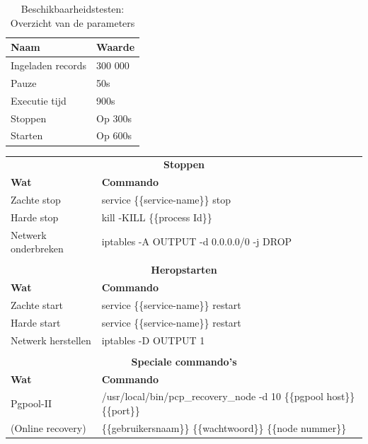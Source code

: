 \begin{table}[h!]
	\centering
	\begin{tabular}{l| l }
		\textbf{Naam} & \textbf{Waarde}  \\
		\hline
		Ingeladen records  & 300 000 \\
		Pauze & 50s \\
		Executie tijd & 900s \\
		Stoppen & Op 300s \\
		Starten & Op 600s \\
	\end{tabular}
	\caption{Beschikbaarheidstesten: Overzicht van de parameters}
	\label{table:beschikbaarheidstesten-parameters}
\end{table}
\begin{table}[t]
	\centering
		\begin{tabular}{l|l}
			\multicolumn{2}{c}{\textbf{Stoppen}} \\
			\textbf{Wat} & \textbf{Commando} \\ 
			\hline
			Zachte stop & service \{\{service-name\}\} stop \\ 
			Harde stop & kill -KILL \{\{process Id\}\} \\ 
			Netwerk onderbreken & iptables -A OUTPUT -d 0.0.0.0/0 -j DROP  \\ 
			\multicolumn{2}{c}{} \\
			\multicolumn{2}{c}{\textbf{Heropstarten}} \\
			\textbf{Wat} & \textbf{Commando} \\ 
			\hline
			Zachte start & service \{\{service-name\}\} restart \\ 
			Harde start & service \{\{service-name\}\} restart \\ 
			Netwerk herstellen & iptables -D OUTPUT 1  \\ 
			\multicolumn{2}{c}{} \\
			\multicolumn{2}{c}{\textbf{Speciale commando's}} \\
			\textbf{Wat} & \textbf{Commando} \\ 
			\hline
			Pgpool-II & /usr/local/bin/pcp\_recovery\_node -d 10 \{\{pgpool host\}\} \{\{port\}\} \\
			\hspace*{0.5cm} (Online recovery) &  \hspace*{0.5cm} \{\{gebruikersnaam\}\} \{\{wachtwoord\}\}  \{\{node nummer\}\} \\
		\end{tabular} 
	\label{table:beschikbaarheidstesten-commandos}
\end{table}

